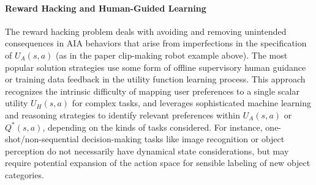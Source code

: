 \paragraph{Reward Hacking and Human-Guided Learning}
The reward hacking problem deals with avoiding and removing unintended consequences in AIA behaviors that arise from imperfections in the specification of $U_A(s,a)$ (as in the paper clip-making robot example above). 
The most popular solution strategies use some form of offline supervisory human guidance or training data feedback in the utility function learning process. 
This approach recognizes the intrinsic difficulty of mapping user preferences to a single scalar utility $U_H(s,a)$ for complex tasks, and leverages sophisticated machine learning and reasoning strategies to identify relevant preferences within $U_A(s,a)$ or $Q^*(s,a)$, depending on the kinds of tasks considered. For instance, one-shot/non-sequential decision-making tasks like image recognition or object perception do not necessarily have dynamical state considerations, but may require potential expansion of the action space for sensible labeling of new object categories. %

